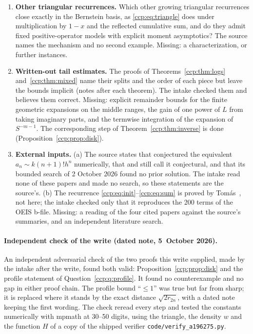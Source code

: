 \documentclass[11pt,letterpaper]{article}
\theoremstyle{remark}\newtheorem{remark}[theorem]{Remark}
\begin{document}
\begin{enumerate}
\item\label{ccp:q:recurrences} \textbf{Other triangular recurrences.}
Which other growing triangular recurrences close exactly in the Bernstein
basis, as \eqref{ccp:eq:triangle} does under multiplication by $1-x$ and the
reflected cumulative sum, and do they admit fixed positive-operator models
with explicit moment asymptotics? The source names the mechanism and no
second example. Missing: a characterization, or further instances.

\item\label{ccp:q:sketches} \textbf{Written-out tail estimates.} The proofs
of Theorems~\ref{ccp:thm:logs} and~\ref{ccp:thm:mixed} name their splits
and the order of each piece but leave the bounds implicit (notes after each
theorem). The intake checked them and believes them correct. Missing:
explicit remainder bounds for the finite geometric expansions on the middle
ranges, the gain of one power of $L$ from taking imaginary parts, and the
termwise integration of the expansion of $S^{-m-1}$. The corresponding step
of Theorem~\ref{ccp:thm:inverse} is done (Proposition~\ref{ccp:prop:disk}).

\item\label{ccp:q:literature} \textbf{External inputs.} (a) The source
states that \cite{bdgr} conjectured the equivalent $a_n\sim k(n+1)!h^n$
numerically, that \cite{rs2014} and \cite{drs2018} still call it
conjectural, and that its bounded search of 2 October 2026 found no prior
solution. The intake read none of these papers and made no search, so
these statements are the source's. (b) The recurrence
\eqref{ccp:eq:init}--\eqref{ccp:eq:sum} is proved by Tom\'as~\cite{tomas},
not here; the intake checked only that it reproduces the 200 terms of the
OEIS b-file. Missing: a reading of the four cited papers against the
source's summaries, and an independent literature search.
\end{enumerate}

\paragraph{Independent check of the write (dated note, 5~October 2026).}
An independent adversarial check of the two proofs this write supplied, made
by the intake after the write, found both valid:
Proposition~\ref{ccp:prop:disk} and the profile statement of
Question~\ref{ccp:q:profile}. It found no counterexample and no gap in
either proof chain. The profile bound ``$\le1$'' was true but far from
sharp; it is replaced where it stands by the exact distance
$\sqrt{2r_{2n}}$, with a dated note keeping the first wording. The check
reread every step and tested the constants numerically with mpmath at 30--50
digits, using the triangle, the density $w$ and the function $H$ of a copy
of the shipped verifier \nolinkurl{code/verify_a196275.py}.
\end{document}
